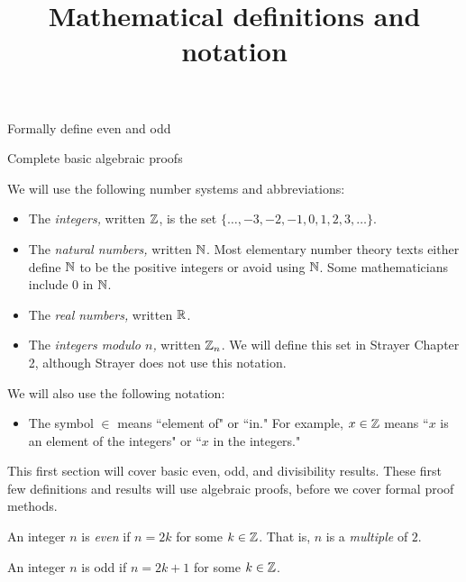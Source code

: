 \documentclass{../ximera}
\title{Mathematical definitions and notation}
\begin{document}
\begin{abstract}
\end{abstract}
\maketitle


\begin{obj}
  \item Formally define even and odd
  \item Complete basic algebraic proofs
\end{obj}



\begin{defn}\label{defn:number-systems} 
  We will use the following number systems and abbreviations:
  \begin{itemize}
    \item The \emph{integers,} written $\mathbb Z$, is the set $\{\dots,-3,-2,-1,0,1,2,3,\dots\}$. 
    \item The \emph{natural numbers,} written $\mathbb N$. Most elementary number theory texts either define $\mathbb N$ to be the positive integers or avoid using $\mathbb N$. Some mathematicians include $0$ in $\mathbb N$.
    \item The \emph{real numbers,} written $\mathbb R$.
    \item The \emph{integers modulo $n$,} written $\mathbb Z_n$. We will define this set in Strayer Chapter 2, although Strayer does not use this notation.
  \end{itemize}
  We will also use the following notation:
  \begin{itemize}
    \item The symbol $\in$ means ``element of" or ``in." For example, $x\in\mathbb Z$ means ``$x$ is an element of the integers" or ``$x$ in the integers."
  \end{itemize}
\end{defn}

This first section will cover basic even, odd, and divisibility results. These first few definitions and results will use algebraic proofs, before we cover formal proof methods.

\begin{defn}\label{defn:even-odd-form}
  An integer $n$ is \emph{even} if $n=2k$ for some $k\in\mathbb Z$. That is, $n$ is a \emph{multiple} of $2.$

  An integer $n$ is odd if $n=2k+1$ for some $k\in\mathbb Z$.
\end{defn}
\end{document}

